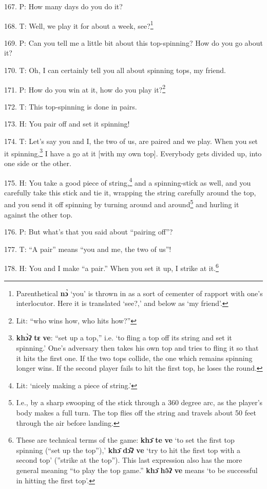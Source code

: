 167. P: How many days do you do it?

168. T: Well, we play it for about a week, see?\footnote{Parenthetical \textbf{nɔ̀} `you' is thrown in as a sort of cementer of rapport with one's interlocutor. Here it is translated `see?,' and below as `my friend'.}

169. P: Can you tell me a little bit about this top-spinning? How do you go about
it?

170. T: Oh, I can certainly tell you all about spinning tops, my friend.

171. P: How do you win at it, how do you play it?\footnote{Lit: ``who wins how, who hits how?''}

172. T: This top-spinning is done in pairs.

173. H: You pair off and set it spinning!

174. T: Let's say you and I, the two of us, are paired and we play. When you set
it spinning,\footnote{\textbf{khɔ̀ʔ} \textbf{tɛ} \textbf{ve}: ``set up a top,'' i.e. `to fling a top off its string and set it spinning.' One's adversary then takes his own top and tries to fling it so that it hits the first one. If the two tops collide, the one which remains spinning longer wins. If the second player fails to hit the first top, he loses the round.} I have a go at it [with my own top]. Everybody gets divided up,
into one side or the other.

175. H: You take a good piece of string,\footnote{Lit: `nicely making a piece of string.'} and a spinning-stick as well, and you
carefully take this stick and tie it, wrapping the string carefully around the
top, and you send it off spinning by turning around and around\footnote{I.e., by a sharp swooping of the stick through a 360 degree arc, as the player's body makes a full turn. The top flies off the string and travels about 50 feet through the air before landing.} and hurling
it against the other top.

176. P: But what's that you said about ``pairing off''?

177. T: ``A pair'' means ``you and me, the two of us''!

178. H:  You and I make ``a pair.''
When you set it up, I strike at it.\footnote{These are technical terms of the game: \textbf{khɔ̄} \textbf{te} \textbf{ve} `to set the first top spinning (``set up the top''),' \textbf{khɔ̄} \textbf{dɔ̂ʔ} \textbf{ve} `try to hit the first top with a second top' (''strike at the top''). This last expression also has the more general meaning ``to play the top game.'' \textbf{khɔ̄} \textbf{hə̂ʔ} \textbf{ve} means `to be successful in hitting the first top'.}

